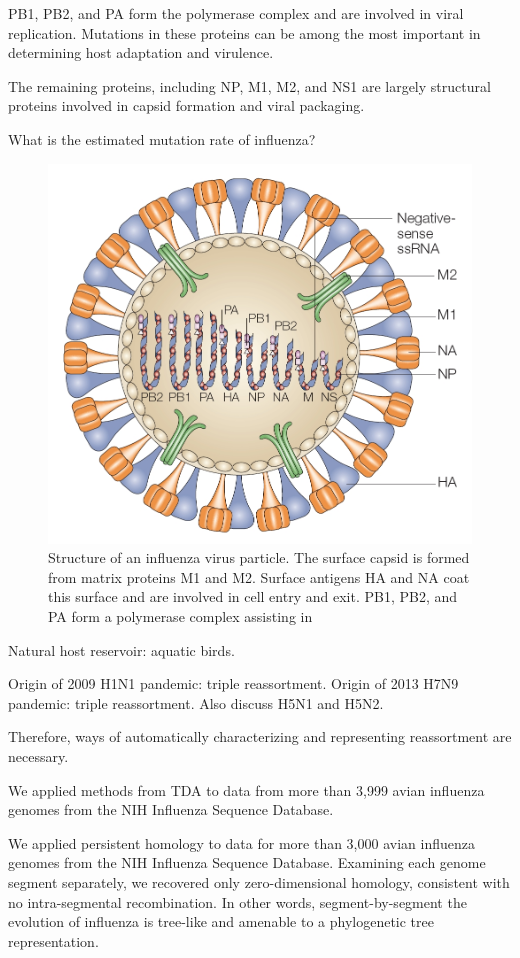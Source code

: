 PB1, PB2, and PA form the polymerase complex and are involved in viral replication.
Mutations in these proteins can be among the most important in determining host adaptation and virulence.

The remaining proteins, including NP, M1, M2, and NS1 are largely structural proteins involved in capsid formation and viral packaging.

What is the estimated mutation rate of influenza?



\begin{figure}
\begin{center}
\centerline{\includegraphics[width=.5\columnwidth]{./fig/flu_genome.jpg}}
\caption[Structure of an influenza virus particle]{Structure of an influenza virus particle. The surface capsid is formed from matrix proteins M1 and M2. Surface antigens HA and NA coat this surface and are involved in cell entry and exit. PB1, PB2, and PA form a polymerase complex assisting in }
\label{fig:flu_genome}
\end{center}
\end{figure}


Natural host reservoir: aquatic birds.

Origin of 2009 H1N1 pandemic: triple reassortment.
Origin of 2013 H7N9 pandemic: triple reassortment.
Also discuss H5N1 and H5N2.

Therefore, ways of automatically characterizing and representing reassortment are necessary.

We applied methods from TDA to data from more than 3,999 avian influenza genomes from the NIH Influenza Sequence Database.


We applied persistent homology to data for more than 3,000 avian influenza genomes from the NIH Influenza Sequence Database.
Examining each genome segment separately, we recovered only zero-dimensional homology, consistent with no intra-segmental recombination.
In other words, segment-by-segment the evolution of influenza is tree-like and amenable to a phylogenetic tree representation.

